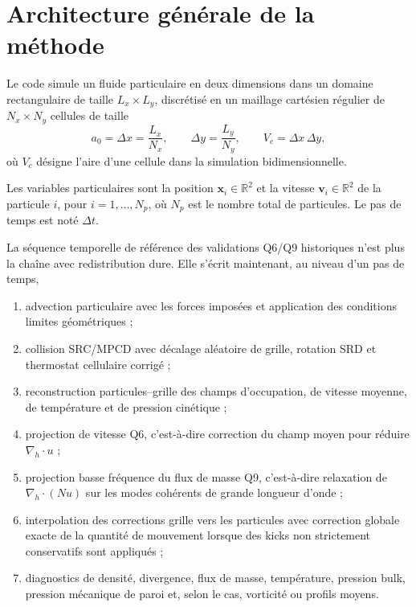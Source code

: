 \documentclass[11pt,a4paper]{article}
\begin{document}
\section{Architecture générale de la méthode}

Le code simule un fluide particulaire en deux dimensions dans un domaine rectangulaire de taille $L_x \times L_y$, discrétisé en un maillage cartésien régulier de $N_x \times N_y$ cellules de taille
\begin{equation}
 a_0 = \Delta x = \frac{L_x}{N_x},
 \qquad
 \Delta y = \frac{L_y}{N_y},
 \qquad
 V_c = \Delta x\,\Delta y,
\end{equation}
où $V_c$ désigne l'aire d'une cellule dans la simulation bidimensionnelle.

Les variables particulaires sont la position $\bm{x}_i \in \mathbb{R}^2$ et la vitesse $\bm{v}_i \in \mathbb{R}^2$ de la particule $i$, pour $i=1,\dots,N_p$, où $N_p$ est le nombre total de particules. Le pas de temps est noté $\Delta t$.

La séquence temporelle de référence des validations Q6/Q9 historiques n'est plus la chaîne avec redistribution dure. Elle s'écrit maintenant, au niveau d'un pas de temps,
\begin{enumerate}[label=\arabic*)]
  \item advection particulaire avec les forces imposées et application des conditions limites géométriques ;
  \item collision SRC/MPCD avec décalage aléatoire de grille, rotation SRD et thermostat cellulaire corrigé ;
  \item reconstruction particules--grille des champs d'occupation, de vitesse moyenne, de température et de pression cinétique ;
  \item projection de vitesse Q6, c'est-à-dire correction du champ moyen pour réduire \(\nabla_h\cdot u\) ;
  \item projection basse fréquence du flux de masse Q9, c'est-à-dire relaxation de \(\nabla_h\cdot(Nu)\) sur les modes cohérents de grande longueur d'onde ;
  \item interpolation des corrections grille vers les particules avec correction globale exacte de la quantité de mouvement lorsque des kicks non strictement conservatifs sont appliqués ;
  \item diagnostics de densité, divergence, flux de masse, température, pression bulk, pression mécanique de paroi et, selon le cas, vorticité ou profils moyens.
\end{enumerate}
\end{document}
